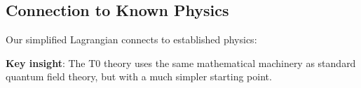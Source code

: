 	\subsection{Connection to Known Physics}
	
	Our simplified Lagrangian connects to established physics:
	
	\begin{table}[htbp]
		\centering
		\caption{Connection to standard field theory}
		\label{tab:standard_connection}
	\end{table}
	
	\textbf{Key insight}: The T0 theory uses the same mathematical machinery as standard quantum field theory, but with a much simpler starting point.

